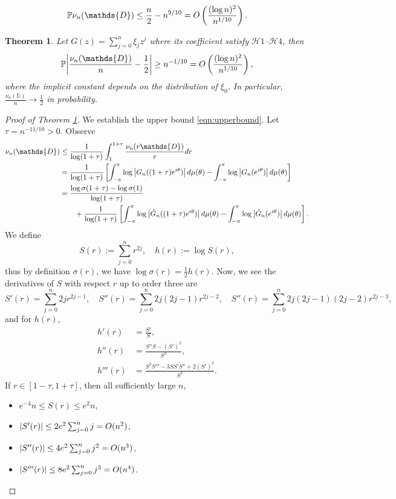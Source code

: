 \documentclass[10pt,a4paper]{amsart}
\newtheorem{theorem}{Theorem}
\newcommand{\CC}[1]{\left[#1\right]}
\newcommand{\PP}[1]{\left(#1\right)}
\renewcommand{\Pr}{\mathbb{P}}
\newcommand{\abs}[1]{\left|#1\right|}
\newcommand{\dd}{\textnormal{d}}
\begin{document}
\begin{equation}\label{eqn:lowerbound}
\Pr{\nu_n(\mathds{D}) \leq \frac{n}{2}-n^{9/10}}= \textnormal{O}\PP{ \frac{(\log n)^2}{n^{1/10}}}.
\end{equation}

\begin{theorem}\label{thm:main01}
Let $G(z)=\sum_{j=0}^{n} \xi_j z^j$ where its coefficient satisfy $\mathcal{H}1$--$\mathcal{H}4$, then
\[
\Pr{\abs{\frac{\nu_n(\mathds{D})}{n} - \frac{1}{2} } \geq n^{-1/10} } =  \textnormal{O}\PP{ \frac{(\log n)^2}{n^{1/10}} },
\]
where the implicit constant depends on the distribution of $\xi_0$. In particular, $\frac{\nu_n(\mathds{D})}{n} \to \frac{1}{2}$ in probability. 
\end{theorem}

\begin{proof}[Proof of Theorem \ref{thm:main01}]
We establish the upper bound \ref{eqn:upperbound}. Let $\tau=n^{-11/10} > 0$. Observe
\begin{align}
\nu_n(\mathds{D}) & \leq \frac{1}{\log(1+\tau)} \int_{1}^{1+\tau} \frac{\nu_n(r\mathds{D})}{r} \dd r \nonumber\\
& = \frac{1}{\log(1+\tau)} \CC{\int_{-\pi}^{\pi} \log \abs{G_n((1+\tau)e^{i\theta})} \dd \mu(\theta) - \int_{-\pi}^{\pi} \log \abs{G_n(e^{i\theta})} \dd \mu(\theta)} \nonumber\\
& = \frac{\log\sigma(1+\tau)-\log\sigma(1)}{\log(1+\tau)} \nonumber\\ 
& \quad\quad + \frac{1}{\log(1+\tau)} \CC{\int_{-\pi}^{\pi} \log \abs{\tilde{G}_n((1+\tau)e^{i\theta})} \dd \mu(\theta) - \int_{-\pi}^{\pi} \log \abs{\tilde{G}_n(e^{i\theta})} \dd \mu(\theta)}.
\end{align}
We define 
\[
S(r):=\sum_{j=0}^n r^{2j},\quad h(r):= \log S(r),
\]
thus by definition $\sigma(r)$, we have $\log \sigma(r) = \frac{1}{2}h(r)$. Now, we see the derivatives of $S$ with respect $r$ up to order three are
\[
S'(r) = \sum_{j=0}^n 2jr^{2j-1},  \quad S''(r)  = \sum_{j=0}^n 2j(2j-1)r^{2j-2}, \quad S''(r)  = \sum_{j=0}^n 2j(2j-1)(2j-2)r^{2j-3},
\]
and for $h(r)$,
\begin{align*}
h'(r) & = \frac{S'}{S}, \\[6pt]
h''(r) & = \frac{S''S-(S')^2}{S^2}, \\[6pt]
h'''(r) & = \frac{S^2S''' - 3 SS'S'' + 2(S')^3}{S^3}.
\end{align*}
If $r\in[1-\tau,1+\tau]$, then all sufficiently large $n$,
\begin{itemize}
\setlength{\itemsep}{6pt}
\item $e^{-4} n \leq S(r) \leq e^2 n$, 
\item $\abs{S'(r)} \leq 2e^2 \sum_{j=0}^n j = \textnormal{O}(n^2)$,
\item $\abs{S''(r)} \leq 4e^2 \sum_{j=0}^n j^2 = \textnormal{O}(n^3)$,
\item $\abs{S'''(r)} \leq 8e^2 \sum_{j=0}^n j^3 = \textnormal{O}(n^4)$.
\end{itemize}


\end{proof}
\end{document}
